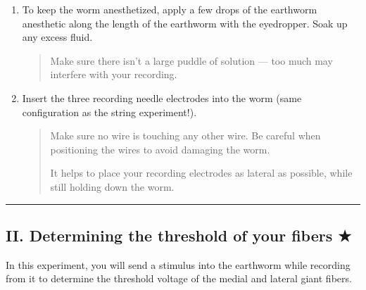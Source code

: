 \documentclass[letterpaper,10pt,english]{jupyterBook}
\begin{document}
\begin{enumerate}
\begin{quote}
\sphinxAtStartPar
{} The anterior end is the end nearest the clitellum, a smooth, non\sphinxhyphen{}segmented band.
\end{quote}

\item {} 
\sphinxAtStartPar
To keep the worm anesthetized, apply a few drops of the earthworm anesthetic along the length of the earthworm with the eyedropper. Soak up any excess fluid.
\begin{quote}

\sphinxAtStartPar
{} Make sure there isn’t a large puddle of solution — too much may interfere with your recording.
\end{quote}

\item {} 
\sphinxAtStartPar
Insert the three recording needle electrodes into the worm (same configuration as the string experiment!).
\begin{quote}

\sphinxAtStartPar
{} Make sure no wire is touching any other wire. Be careful when positioning the wires to avoid damaging the worm.

\sphinxAtStartPar
{} It helps to place your recording electrodes as lateral as possible, while still holding down the worm.
\end{quote}

\end{enumerate}


\bigskip\hrule\bigskip



\subsection{II. Determining the threshold of your fibers ★}
\label{\detokenize{Earthworm:ii-determining-the-threshold-of-your-fibers}}
\sphinxAtStartPar
In this experiment, you will send a stimulus into the earthworm while recording from it to determine the threshold voltage of the medial and lateral giant fibers.
\end{document}
